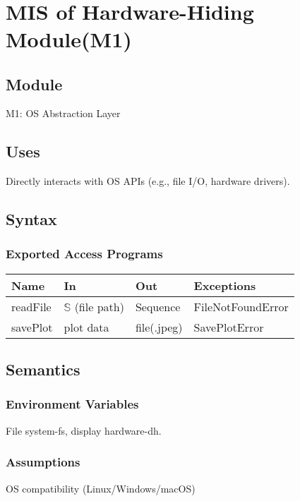 \documentclass[12pt, titlepage]{article}
\begin{document}
\newpage
~\newpage

\section{MIS of Hardware-Hiding Module(M1)}

\subsection{Module}
M1: OS Abstraction Layer

\subsection{Uses}

\item Directly interacts with OS APIs (e.g., file I/O, hardware drivers).


\subsection{Syntax}

\subsubsection{Exported Access Programs}

\begin{center}
\begin{tabular}{p{2cm} p{4cm} p{4cm} p{4cm}}
\hline
\textbf{Name} & \textbf{In} & \textbf{Out} & \textbf{Exceptions} \\
\hline
readFile & $\mathbb{S}$ (file path) & Sequence & FileNotFoundError \\
savePlot & plot data & file(.jpeg) & SavePlotError \\
\hline
\end{tabular}
\end{center}

\subsection{Semantics}

\subsubsection{Environment Variables}

File system-fs, display hardware-dh.
\subsubsection{Assumptions}
OS compatibility (Linux/Windows/macOS)
\end{document}

